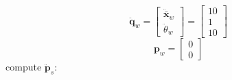 \documentclass[10pt,letterpaper]{article}
\providecommand{\vect}[1]{\boldsymbol#1}
\begin{document}
	\[
	\ddot{\vect{q}}_w = \begin{bmatrix} \ddot{\bar{\vect{x}}}_w \\ \ddot{\theta}_w \end{bmatrix} = \begin{bmatrix} 10 \\ 1 \\ 10 \end{bmatrix}
	\]
	\[
	\vect{p}_w = \begin{bmatrix} 0 \\ 0 \end{bmatrix}
	\]
	compute $\ddot{\vect{p}}_s$:
	
\end{document}
